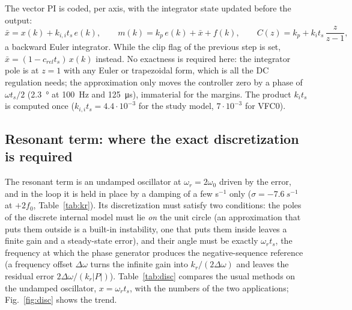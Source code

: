 \documentclass[10pt,a4paper]{scrartcl}
\newcommand{\ts}{t_s}
\newcommand{\wo}{\omega_0}
\newcommand{\wres}{\omega_r}
\newcommand{\kii}{k_{i,i}}
\begin{document}
\begin{onehalfspace}
The vector PI is coded, per axis, with the integrator state updated before the output:
\begin{equation}
\bar x = x(k) + \kii\ts\,e(k), \qquad m(k) = k_p\,e(k) + \bar x + f(k),
\qquad C(z) = k_p + k_i\ts\,\frac{z}{z - 1},
\label{eq:pi_code}
\end{equation}
a backward Euler integrator. While the clip flag of the previous step is set, $\bar x = (1 - c_{rel}\ts)\,x(k)$ instead. No exactness is required here: the integrator pole is at $z = 1$ with any Euler or trapezoidal form, which is all the DC regulation needs; the approximation only moves the controller zero by a phase of $\omega\ts/2$ (\SI{2.3}{\degree} at \SI{100}{Hz} and \SI{125}{\micro s}), immaterial for the margins. The product $k_i\ts$ is computed once ($\kii\ts = 4.4\cdot10^{-3}$ for the study model, $7\cdot10^{-3}$ for VFC0).

\subsection{Resonant term: where the exact discretization is required}
\label{sec:disc_resonant}

The resonant term is an undamped oscillator at $\wres = 2\wo$ driven by the error, and in the loop it is held in place by a damping of a few s$^{-1}$ only ($\sigma = \SI{-7.6}{s^{-1}}$ at $+2f_0$, Table~\ref{tab:kr}). Its discretization must satisfy two conditions: the poles of the discrete internal model must lie \emph{on} the unit circle (an approximation that puts them outside is a built-in instability, one that puts them inside leaves a finite gain and a steady-state error), and their angle must be exactly $\wres\ts$, the frequency at which the phase generator produces the negative-sequence reference (a frequency offset $\Delta\omega$ turns the infinite gain into $k_r/(2\Delta\omega)$ and leaves the residual error $2\Delta\omega/(k_r|P|)$). Table~\ref{tab:disc} compares the usual methods on the undamped oscillator, $x = \wres\ts$, with the numbers of the two applications; Fig.~\ref{fig:disc} shows the trend.


\end{onehalfspace}
\end{document}
